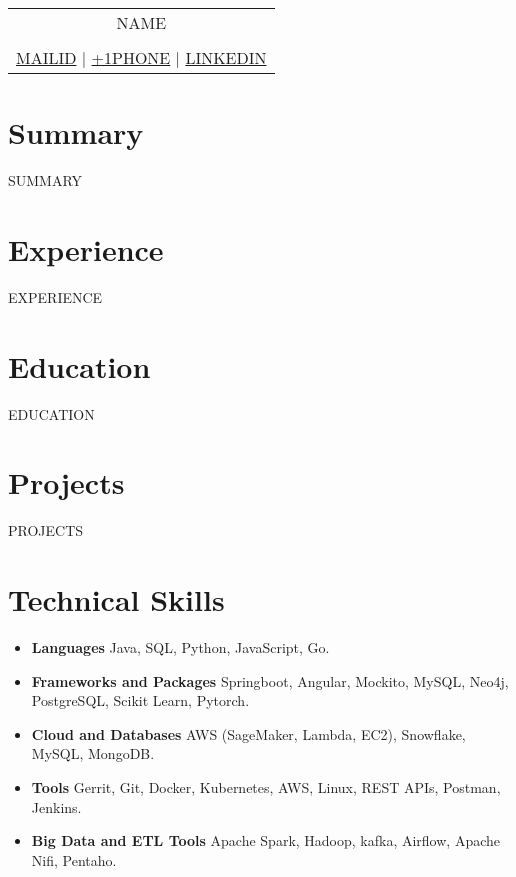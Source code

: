 \documentclass[a4paper,3pt]{article}
\begin{document}
\pagestyle{empty} 


\begin{tabularx}{\linewidth}{@{} C @{}}
\color[HTML]{1C033C} \Huge{{NAME}} \\[0.5pt]
\\
{\href{mailto: {{MAILID}}}{\raisebox{-0.05\height}{\faEnvelope} {{MAILID}}} $|$}
{\href{tel:+1{{PHONE}}}{\raisebox{-0.05\height}{\faMobile} +1{{PHONE}}}  $|$}
{\href{{{LINKEDIN}}}{\raisebox{-0.05\height}{\faLinkedin} {{LINKEDIN}}}}
\end{tabularx}

\section{Summary}
{{SUMMARY}}

\section{Experience}

{{EXPERIENCE}}

\section{Education}
{{EDUCATION}}

\section{Projects}

{{PROJECTS}}


\section{Technical Skills}
\begin{itemize}[nosep,after=\strut, leftmargin=2em, itemsep=1pt]
\item \textbf{Languages}
\hspace*{18.5ex}                  Java, SQL, Python, JavaScript, Go.
\item \textbf{Frameworks and Packages}
 \hspace*{4ex} Springboot, Angular, Mockito, MySQL, Neo4j, PostgreSQL, Scikit Learn, Pytorch.
\item\textbf{Cloud and Databases}
 \hspace*{9.2ex} AWS (SageMaker, Lambda, EC2), Snowflake, MySQL, MongoDB.
 \item\textbf{Tools}
 \hspace*{23.8ex} Gerrit, Git, Docker, Kubernetes, AWS, Linux, REST APIs, Postman, Jenkins.
\item\textbf{Big Data and ETL Tools}
 \hspace*{7.3ex} Apache Spark, Hadoop, kafka, Airflow, Apache Nifi, Pentaho.
 \end{itemize}
\end{document}
